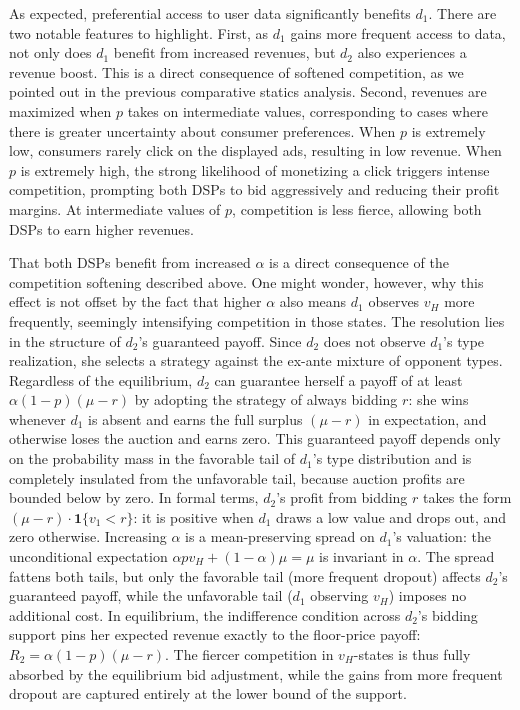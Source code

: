 \noindent As expected, preferential access to user data significantly benefits $ d_1 $. There are two notable features to highlight. First, as $ d_1 $ gains more frequent access to data, not only does $ d_1 $ benefit from increased revenues, but $ d_2 $ also experiences a revenue boost. This is a direct consequence of softened competition, as we pointed out in the previous comparative statics analysis. Second, revenues are maximized when $ p $ takes on intermediate values, corresponding to cases where there is greater uncertainty about consumer preferences. When $ p $ is extremely low, consumers rarely click on the displayed ads, resulting in low revenue. When $ p $ is extremely high, the strong likelihood of monetizing a click triggers intense competition, prompting both DSPs to bid aggressively and reducing their profit margins. At intermediate values of $ p $, competition is less fierce, allowing both DSPs to earn higher revenues.

\noindent That both DSPs benefit from increased $\alpha$ is a direct consequence of the competition softening described above. One might wonder, however, why this effect is not offset by the fact that higher $\alpha$ also means $d_1$ observes $v_H$ more frequently, seemingly intensifying competition in those states. The resolution lies in the structure of $d_2$'s guaranteed payoff. Since $d_2$ does not observe $d_1$'s type realization, she selects a strategy against the ex-ante mixture of opponent types. Regardless of the equilibrium, $d_2$ can guarantee herself a payoff of at least $\alpha(1-p)(\mu - r)$ by adopting the strategy of always bidding $r$: she wins whenever $d_1$ is absent and earns the full surplus $(\mu - r)$ in expectation, and otherwise loses the auction and earns zero. This guaranteed payoff depends only on the probability mass in the favorable tail of $d_1$'s type distribution and is completely insulated from the unfavorable tail, because auction profits are bounded below by zero. In formal terms, $d_2$'s profit from bidding $r$ takes the form $(\mu - r) \cdot \mathbf{1}\{v_1 < r\}$: it is positive when $d_1$ draws a low value and drops out, and zero otherwise. Increasing $\alpha$ is a mean-preserving spread on $d_1$'s valuation: the unconditional expectation $\alpha p v_H + (1-\alpha)\mu = \mu$ is invariant in $\alpha$. The spread fattens both tails, but only the favorable tail (more frequent dropout) affects $d_2$'s guaranteed payoff, while the unfavorable tail ($d_1$ observing $v_H$) imposes no additional cost. In equilibrium, the indifference condition across $d_2$'s bidding support pins her expected revenue exactly to the floor-price payoff: $R_2 = \alpha(1-p)(\mu - r)$. The fiercer competition in $v_H$-states is thus fully absorbed by the equilibrium bid adjustment, while the gains from more frequent dropout are captured entirely at the lower bound of the support.

